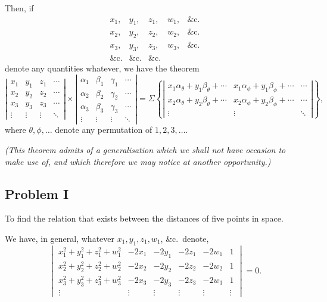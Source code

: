 \documentclass[11pt,a4paper]{book}
\theoremstyle{plain}
\theoremstyle{definition}
\theoremstyle{remark}
\begin{document}
Then, if
\[
\begin{array}{ccccc}
x_1, & y_1, & z_1, & w_1, & \&\mathrm{c.} \\
x_2, & y_2, & z_2, & w_2, & \&\mathrm{c.} \\
x_3, & y_3, & z_3, & w_3, & \&\mathrm{c.} \\
\&\mathrm{c.} & \&\mathrm{c.} & \&\mathrm{c.}
\end{array}
\]
denote any quantities whatever, we have the theorem
\[
\left|\begin{array}{cccc}
x_1 & y_1 & z_1 & \cdots \\
x_2 & y_2 & z_2 & \cdots \\
x_3 & y_3 & z_3 & \cdots \\
\vdots & \vdots & \vdots & \ddots
\end{array}\right|
\times
\left|\begin{array}{cccc}
\alpha_1 & \beta_1 & \gamma_1 & \cdots \\
\alpha_2 & \beta_2 & \gamma_2 & \cdots \\
\alpha_3 & \beta_3 & \gamma_3 & \cdots \\
\vdots & \vdots & \vdots & \ddots
\end{array}\right|
= \Sigma \left\{
\left|\begin{array}{cccc}
x_1\alpha_{\theta} + y_1\beta_{\theta} + \cdots &
x_1\alpha_{\phi} + y_1\beta_{\phi} + \cdots & \cdots \\
x_2\alpha_{\theta} + y_2\beta_{\theta} + \cdots &
x_2\alpha_{\phi} + y_2\beta_{\phi} + \cdots & \cdots \\
\vdots & \vdots & \ddots
\end{array}\right|
\right\},
\]
where $\theta, \phi, \ldots$ denote any permutation of $1, 2, 3, \ldots$.

\textit{(This theorem admits of a generalisation which we shall not have occasion to make use of, and which therefore we may notice at another opportunity.)}

\subsection*{Problem I}

To find the relation that exists between the distances of five points in space.

We have, in general, whatever $x_1, y_1, z_1, w_1$, \&c.\ denote,
\[
\begin{vmatrix}
x_1^2 + y_1^2 + z_1^2 + w_1^2 & -2x_1 & -2y_1 & -2z_1 & -2w_1 & 1 \\
x_2^2 + y_2^2 + z_2^2 + w_2^2 & -2x_2 & -2y_2 & -2z_2 & -2w_2 & 1 \\
x_3^2 + y_3^2 + z_3^2 + w_3^2 & -2x_3 & -2y_3 & -2z_3 & -2w_3 & 1 \\
\vdots & \vdots & \vdots & \vdots & \vdots & \vdots
\end{vmatrix} = 0.
\]
\end{document}
